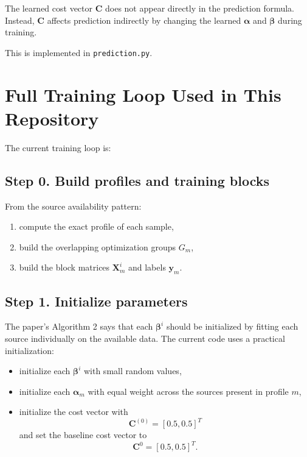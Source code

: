 \documentclass[11pt]{article}
\newcommand{\Xm}{\mathbf{X}_m}
\newcommand{\ym}{\mathbf{y}_m}
\newcommand{\alpham}{\boldsymbol{\alpha}_m}
\newcommand{\betai}{\boldsymbol{\beta}^i}
\newcommand{\betavec}{\boldsymbol{\beta}}
\newcommand{\alphavec}{\boldsymbol{\alpha}}
\newcommand{\costvec}{\mathbf{C}}
\begin{document}
The learned cost vector $\costvec$ does not appear directly in the prediction
formula. Instead, $\costvec$ affects prediction indirectly by changing the
learned $\alphavec$ and $\betavec$ during training.

This is implemented in \texttt{prediction.py}.

\section{Full Training Loop Used in This Repository}

The current training loop is:

\subsection*{Step 0. Build profiles and training blocks}

From the source availability pattern:
\begin{enumerate}
  \item compute the exact profile of each sample,
  \item build the overlapping optimization groups $G_m$,
  \item build the block matrices $\Xm^i$ and labels $\ym$.
\end{enumerate}

\subsection*{Step 1. Initialize parameters}

The paper's Algorithm 2 says that each $\betai$ should be initialized by
fitting each source individually on the available data. The current code uses a
practical initialization:
\begin{itemize}
  \item initialize each $\betai$ with small random values,
  \item initialize each $\alpham$ with equal weight across the sources present
  in profile $m$,
  \item initialize the cost vector with
  \begin{equation}
  \label{eq:initial-cost}
  \costvec^{(0)} = [0.5, 0.5]^T
  \end{equation}
  and set the baseline cost vector to
  \begin{equation}
  \label{eq:baseline-cost}
  \costvec^0 = [0.5, 0.5]^T.
  \end{equation}
\end{itemize}
\end{document}

